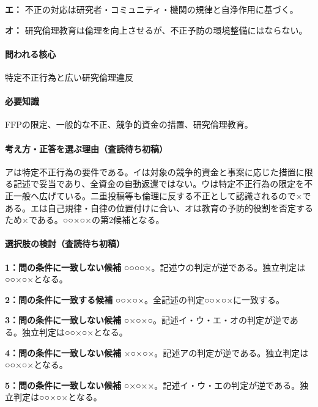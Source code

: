 \noindent\textbf{エ：} 不正の対応は研究者・コミュニティ・機関の規律と自浄作用に基づく。\par

\noindent\textbf{オ：} 研究倫理教育は倫理を向上させるが、不正予防の環境整備にはならない。\par

\paragraph{問われる核心} 特定不正行為と広い研究倫理違反

\paragraph{必要知識} FFPの限定、一般的な不正、競争的資金の措置、研究倫理教育。

\paragraph{考え方・正答を選ぶ理由（査読待ち初稿）} アは特定不正行為の要件である。イは対象の競争的資金と事案に応じた措置に限る記述で妥当であり、全資金の自動返還ではない。ウは特定不正行為の限定を不正一般へ広げている。二重投稿等も倫理に反する不正として認識されるので×である。エは自己規律・自律の位置付けに合い、オは教育の予防的役割を否定するため×である。○○×○×の第2候補となる。

\paragraph{選択肢の検討（査読待ち初稿）}\mbox{}\par

\noindent\textbf{1：問の条件に一致しない候補} ○○○○×。記述ウの判定が逆である。独立判定は○○×○×となる。\par

\noindent\textbf{2：問の条件に一致する候補} ○○×○×。全記述の判定○○×○×に一致する。\par

\noindent\textbf{3：問の条件に一致しない候補} ○×○×○。記述イ・ウ・エ・オの判定が逆である。独立判定は○○×○×となる。\par

\noindent\textbf{4：問の条件に一致しない候補} ×○×○×。記述アの判定が逆である。独立判定は○○×○×となる。\par

\noindent\textbf{5：問の条件に一致しない候補} ○×○××。記述イ・ウ・エの判定が逆である。独立判定は○○×○×となる。\par

